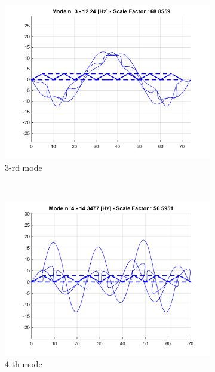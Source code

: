 \documentclass[10pt,a4paper,final]{report}
\begin{document}
\begin{figure}[h]
\begin{subfigure}[t]{0.3\textwidth}
        \end{subfigure}
        \begin{subfigure}[t]{0.3\textwidth}
                \includegraphics[width=\textwidth]{mode3}
                \caption{$3$-rd mode}
                \label{fig:mode3}
        \end{subfigure}
        \\
        \centering
        \begin{subfigure}[b]{0.3\textwidth}
                \includegraphics[width=\textwidth]{mode4}
                \caption{$4$-th mode}
                \label{fig:mode4}
        \end{subfigure}%
        \begin{subfigure}[b]{0.3\textwidth}

\end{subfigure}
\end{figure}
\end{document}
